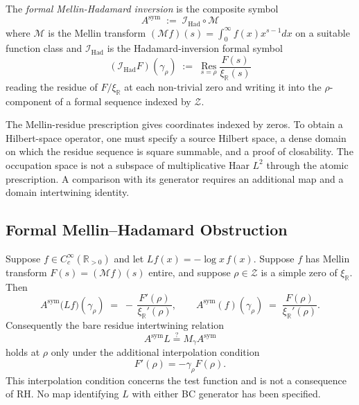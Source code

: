 \begin{definition}
\label{v4-arith:w9-r4:def:formal-MH}
\ClaimStatusDefinitional The \emph{formal Mellin-Hadamard inversion}
is the composite symbol
\begin{equation}
\label{v4-arith:w9-r4:eq:formal-MH}
A^{\mathrm{sym}}\;:=\;\mathcal{I}_{\mathrm{Had}}\circ\mathcal{M}
\end{equation}
where \(\mathcal{M}\) is the Mellin transform
\((\mathcal{M}f)(s)=\int_{0}^{\infty}f(x)x^{s-1}dx\) on a suitable
function class and \(\mathcal{I}_{\mathrm{Had}}\) is the
Hadamard-inversion formal symbol
\[
(\mathcal{I}_{\mathrm{Had}}F)(\gamma_{\rho})\;:=\;\operatorname*{Res}_{s=\rho}\frac{F(s)}{\xi_{\mathbb{R}}(s)}
\]
reading the residue of \(F/\xi_{\mathbb{R}}\) at each non-trivial zero
and writing it into the \(\rho\)-component of a formal sequence
indexed by \(\mathcal{Z}\).
\end{definition}

\begin{remark}
\label{v4-arith:w9-r4:rem:Asym-not-operator}
The Mellin-residue prescription gives coordinates indexed by zeros.
To obtain a Hilbert-space operator, one must specify a source
Hilbert space, a dense domain on which the residue sequence is
square summable, and a proof of closability. The occupation space
is not a subspace of multiplicative Haar \(L^2\) through the
atomic prescription. A comparison with its generator requires
an additional map and a domain intertwining identity.
\end{remark}

\subsection{Formal Mellin--Hadamard Obstruction}
\label{v4-arith:w9-r4:formal-flow:formal-intertwine}

\begin{lemma}
\label{v4-arith:w9-r4:lem:formal-intertwine}
\ClaimStatusProvedHere Suppose \(f\in C_{c}^{\infty}(\mathbb{R}_{>0})\)
and let \(Lf(x)=-\log x\,f(x)\). Suppose \(f\)
has Mellin transform \(F(s)=(\mathcal{M}f)(s)\) entire, and suppose
\(\rho\in\mathcal{Z}\) is a simple zero of \(\xi_{\mathbb R}\). Then
\begin{equation}
\label{v4-arith:w9-r4:eq:formal-intertwine}
A^{\mathrm{sym}}\bigl(Lf\bigr)(\gamma_{\rho})
\;=\;
-\,\frac{F'(\rho)}{\xi_{\mathbb R}'(\rho)},
\qquad
A^{\mathrm{sym}}(f)(\gamma_{\rho})
\;=\;
\frac{F(\rho)}{\xi_{\mathbb R}'(\rho)}.
\end{equation}
Consequently the bare residue intertwining relation
\[
A^{\mathrm{sym}}L
\stackrel{?}{=}
M_{\gamma}A^{\mathrm{sym}}
\]
holds at \(\rho\) only under the additional interpolation condition
\[
F'(\rho)=-\gamma_{\rho}F(\rho).
\]
This interpolation condition concerns the test function and is not
a consequence of RH. No map identifying \(L\) with either BC
generator has been specified.
\end{lemma}

